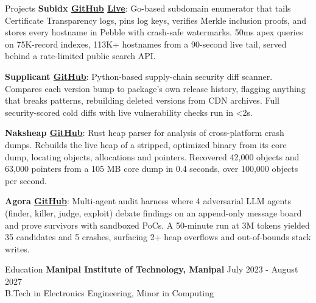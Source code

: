 \documentclass{resume}
\begin{document}
\vspace{-0.8em}
\begin{rSection}{Projects}
\noindent \textbf{Subidx \textbar{} \href{https://github.com/vee1e/subidx}{GitHub} \textbar{} \href{https://subidx.lverma.com}{Live}}: Go-based subdomain enumerator that tails Certificate Transparency logs, pins log keys, verifies Merkle inclusion proofs, and stores every hostname in Pebble with crash-safe watermarks. 50ms apex queries on 75K-record indexes, 113K+ hostnames from a 90-second live tail, served behind a rate-limited public search API.\par
\noindent \textbf{Supplicant \textbar{} \href{https://github.com/vee1e/supplicant}{GitHub}}: Python-based supply-chain security diff scanner. Compares each version bump to package's own release history, flagging anything that breaks patterns, rebuilding deleted versions from CDN archives. Full security-scored cold diffs with live vulnerability checks run in \textless2s.\par
\noindent \textbf{Naksheap \textbar{} \href{https://github.com/vee1e/naksheap}{GitHub}}: Rust heap parser for analysis of cross-platform crash dumps. Rebuilds the live heap of a stripped, optimized binary from its core dump, locating objects, allocations and pointers. Recovered 42,000 objects and 63,000 pointers from a 105 MB core dump in 0.4 seconds, over 100,000 objects per second.\par
\noindent \textbf{Agora \textbar{} \href{https://github.com/vee1e/agora}{GitHub}}: Multi-agent audit harness where 4 adversarial LLM agents (finder, killer, judge, exploit) debate findings on an append-only message board and prove survivors with sandboxed PoCs. A 50-minute run at 3M tokens yielded 35 candidates and 5 crashes, surfacing 2+ heap overflows and out-of-bounds stack writes.\par
\end{rSection}

\vspace{-0.6em}
\begin{rSection}{Education}
    {\bf Manipal Institute of Technology, Manipal} \hfill {July 2023 - August 2027}  \\
    {B.Tech in Electronics Engineering, Minor in Computing} \hfill \\
\end{rSection}
\end{document}
